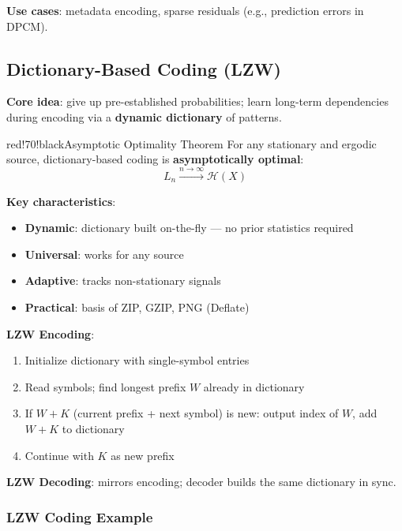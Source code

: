 \textbf{Use cases}: metadata encoding, sparse residuals (e.g., prediction errors in DPCM).

\subsection{Dictionary-Based Coding (LZW)}

\textbf{Core idea}: give up pre-established probabilities; learn long-term dependencies during encoding via a \textbf{dynamic dictionary} of patterns.

\begin{calloutbox}{red!70!black}{Asymptotic Optimality Theorem}
For any stationary and ergodic source, dictionary-based coding is \textbf{asymptotically optimal}:
\[
L_n \xrightarrow{n\to\infty} \mathcal{H}(X)
\]
\end{calloutbox}

\textbf{Key characteristics}:
\begin{itemize}
\item \textbf{Dynamic}: dictionary built on-the-fly — no prior statistics required
\item \textbf{Universal}: works for any source
\item \textbf{Adaptive}: tracks non-stationary signals
\item \textbf{Practical}: basis of ZIP, GZIP, PNG (Deflate)
\end{itemize}

\textbf{LZW Encoding}:
\begin{enumerate}
\item Initialize dictionary with single-symbol entries
\item Read symbols; find longest prefix $W$ already in dictionary
\item If $W + K$ (current prefix + next symbol) is new: output index of $W$, add $W+K$ to dictionary
\item Continue with $K$ as new prefix
\end{enumerate}

\textbf{LZW Decoding}: mirrors encoding; decoder builds the same dictionary in sync.

\subsubsection{LZW Coding Example}

